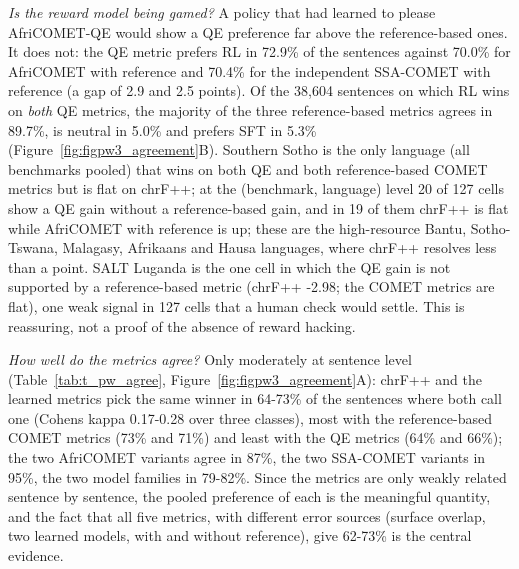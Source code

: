 \emph{Is the reward model being gamed?} A policy that had learned to please AfriCOMET-QE would show a QE preference far above the reference-based ones. It does not: the QE metric prefers RL in 72.9\% of the sentences against 70.0\% for AfriCOMET with reference and 70.4\% for the independent SSA-COMET with reference (a gap of 2.9 and 2.5 points). Of the 38,604 sentences on which RL wins on \emph{both} QE metrics, the majority of the three reference-based metrics agrees in 89.7\%, is neutral in 5.0\% and prefers SFT in 5.3\% (Figure~\ref{fig:figpw3_agreement}B). Southern Sotho is the only language (all benchmarks pooled) that wins on both QE and both reference-based COMET metrics but is flat on chrF++; at the (benchmark, language) level 20 of 127 cells show a QE gain without a reference-based gain, and in 19 of them chrF++ is flat while AfriCOMET with reference is up; these are the high-resource Bantu, Sotho-Tswana, Malagasy, Afrikaans and Hausa languages, where chrF++ resolves less than a point. SALT Luganda is the one cell in which the QE gain is not supported by a reference-based metric (chrF++ -2.98; the COMET metrics are flat), one weak signal in 127 cells that a human check would settle. This is reassuring, not a proof of the absence of reward hacking.

\emph{How well do the metrics agree?} Only moderately at sentence level (Table~\ref{tab:t_pw_agree}, Figure~\ref{fig:figpw3_agreement}A): chrF++ and the learned metrics pick the same winner in 64-73\% of the sentences where both call one (Cohen\textquotesingle s kappa 0.17-0.28 over three classes), most with the reference-based COMET metrics (73\% and 71\%) and least with the QE metrics (64\% and 66\%); the two AfriCOMET variants agree in 87\%, the two SSA-COMET variants in 95\%, the two model families in 79-82\%. Since the metrics are only weakly related sentence by sentence, the pooled preference of each is the meaningful quantity, and the fact that all five metrics, with different error sources (surface overlap, two learned models, with and without reference), give 62-73\% is the central evidence.

